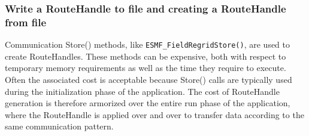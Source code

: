  
\setlength{\oldparskip}{\parskip}
\setlength{\parskip}{1.5ex}
\setlength{\oldparindent}{\parindent}
\setlength{\parindent}{0pt}
\setlength{\oldbaselineskip}{\baselineskip}
\setlength{\baselineskip}{11pt}
 
\def\bv{\begin{verbatim}}
\def\ev{\end{verbatim}}
\def\be{\begin{equation}}
\def\ee{\end{equation}}
\def\bea{\begin{eqnarray}}
\def\eea{\end{eqnarray}}
\def\bi{\begin{itemize}}
\def\ei{\end{itemize}}
\def\bn{\begin{enumerate}}
\def\en{\end{enumerate}}
\def\bd{\begin{description}}
\def\ed{\end{description}}
\def\({\left (}
\def\){\right )}
\def\[{\left [}
\def\]{\right ]}
\def\<{\left  \langle}
\def\>{\right \rangle}
\def\cI{{\cal I}}
\def\diag{\mathop{\rm diag}}
\def\tr{\mathop{\rm tr}}


 

   \subsubsection{Write a RouteHandle to file and creating a RouteHandle from file}
   \label{RH:RHfromFile}
  
   Communication Store() methods, like {\tt ESMF\_FieldRegridStore()}, are used
   to create RouteHandles. These methods can be expensive, both with respect to
   temporary memory requirements as well as the time they require to execute.
   Often the associated cost is acceptable because Store() calls are typically
   used during the initialization phase of the application. The cost of 
   RouteHandle generation is therefore armorized over the entire run phase
   of the application, where the RouteHandle is applied over and over to 
   transfer data according to the same communication pattern.
  
